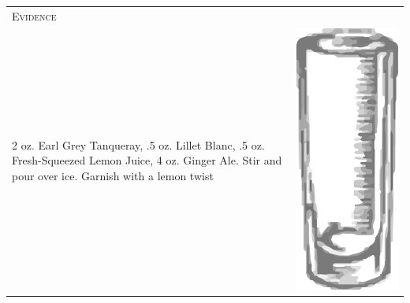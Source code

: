 \documentclass{article}
\begin{document}
\begin{tabular}{p{2in} p{0.5in}}
	\multicolumn{2}{p{3in}}{\centering\Huge\textsc{Evidence}}\\ 
	  \vspace{-0.1in}2 oz. Earl Grey Tanqueray, .5 oz. Lillet Blanc, .5 oz. Fresh-Squeezed Lemon Juice, 4 oz. Ginger Ale. Stir and pour over ice. Garnish with a lemon twist &
	  \vspace{-0.1in} \includegraphics{collins.png}
\end{tabular}\\
\end{document}
